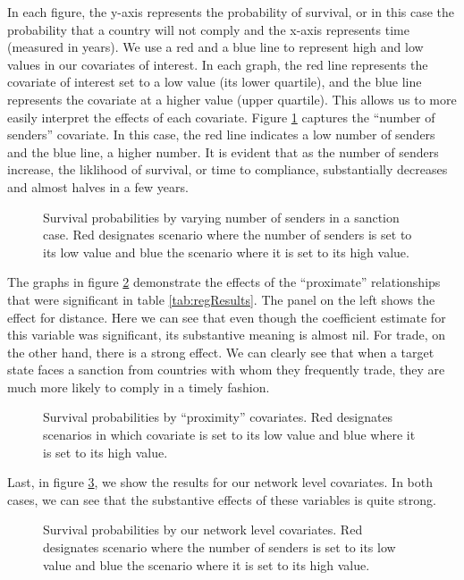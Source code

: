 In each figure, the y-axis represents the probability of survival, or in this case the probability that a country will not comply and the x-axis represents time (measured in years). We use a red and a blue line to represent high and low values in our covariates of interest. In each graph, the red line represents the covariate of interest set to a low value (its lower quartile), and the blue line represents the covariate at a higher value (upper quartile). This allows us to more easily interpret the effects of each covariate. Figure \ref{fig:surv1} captures the ``number of senders'' covariate. In this case, the red line indicates a low number of senders and the blue line, a higher number. It is evident that as the number of senders increase, the liklihood of survival, or time to compliance, substantially decreases and almost halves in a few years. 

\begin{figure}[ht]
	\centering
	\caption{Survival probabilities by varying number of senders in a sanction case. Red designates scenario where the number of senders is set to its low value and blue the scenario where it is set to its high value.}
	\resizebox{0.7\textwidth}{!}{}
	\label{fig:surv1}
\end{figure}
\FloatBarrier

The graphs in figure \ref{fig:surv2} demonstrate the effects of the ``proximate'' relationships that were significant in table \ref{tab:regResults}. The panel on the left shows the effect for distance. Here we can see that even though the coefficient estimate for this variable was significant, its substantive meaning is almost nil. For trade, on the other hand, there is a strong effect. We can clearly see that when a target state faces a sanction from countries with whom they frequently trade, they are much more likely to comply in a timely fashion.

\begin{figure}[ht]
	\centering
	\caption{Survival probabilities by ``proximity'' covariates. Red designates scenarios in which covariate is set to its low value and blue where it is set to its high value.}
	\resizebox{1\textwidth}{!}{}	
	\label{fig:surv2}
\end{figure}
\FloatBarrier

Last, in figure \ref{fig:surv3}, we show the results for our network level covariates. In both cases, we can see that the substantive effects of these variables is quite strong. 

\begin{figure}[ht]
	\centering
	\caption{Survival probabilities by our network level covariates. Red designates scenario where the number of senders is set to its low value and blue the scenario where it is set to its high value.}
	\resizebox{1\textwidth}{!}{}	
	\label{fig:surv3}	
\end{figure}
\FloatBarrier